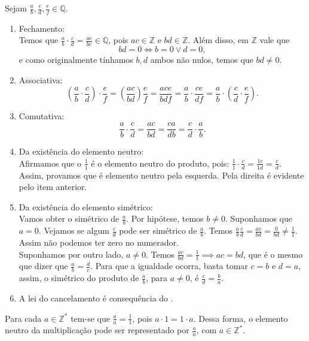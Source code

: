 \documentclass[../main.tex]{subfiles}
\begin{document}
\begin{dem}
    Sejam $\frac{a}{b}, \frac{c}{d}, \frac{e}{f} \in \mathbb{Q}$.
    \begin{enumerate}[label=(\roman*)]
        \item Fechamento: \\
        Temos que $\frac{a}{b} \cdot \frac{c}{d} = \frac{ac}{bc} \in \mathbb{Q}$, pois  
        $ac \in \mathbb{Z}$ e $bd \in \mathbb{Z}$. Além disso, em $\mathbb{Z}$ vale que 
        \[ bd = 0 \iff b = 0 \lor d = 0, \] e como originalmente tínhamos $b,d$ ambos não nulos, temos que $bd \neq 0$.
        
        \item Associativa: \\
            \[
            \left( \frac{a}{b} \cdot \frac{c}{d}\right) \cdot \frac{e}{f} = 
            \left(\frac{ac}{bd}\right) \frac{e}{f} = 
            \frac{ace}{bdf} = \frac{a}{b} \cdot \frac{ce}{df} = 
            \frac{a}{b} \cdot \left(\frac{c}{d} \cdot \frac{e}{f}\right)
            .
            \]
        
        \item Comutativa: \\
        \[ \frac{a}{b} \cdot \frac{c}{d} = 
            \frac{ac}{bd} = 
            \frac{ca}{db} = 
            \frac{c}{d} \cdot \frac{a}{b} . \]
            
        
        \item Da existência do elemento neutro: \\
        Afirmamos que o $\frac{1}{1}$ é o elemento neutro do produto, pois: $ \frac{1}{1}\cdot \frac{c}{d} = \frac{1c}{1d} = \frac{c}{d}$.
        Assim, provamos que é elemento neutro pela esquerda. Pela direita é evidente pelo item anterior. 
        
        
        \item Da existência do elemento simétrico: \\
        Vamos obter o simétrico de $\frac{a}{b}$. Por hipótese, temos $b \neq 0$. Suponhamos que $a=0$. Vejamos se algum $\frac{c}{d}$
        pode ser simétrico de $\frac{a}{b}$. Temos $\frac{a}{b} \frac{c}{d} = \frac{ac}{bd} = \frac{0}{bd} \neq \frac{1}{1}$. Assim não podemos ter zero no numerador. \\
        Suponhamos por outro lado, $a \neq 0$. Temos $\frac{ac}{bd} = \frac{1}{1} \implies ac = bd$, que é o mesmo que dizer que $\frac{a}{b} = \frac{d}{c}$. Para que a igualdade ocorra, basta tomar $c=b$ e $d=a$, assim, o simétrico do produto de $\frac{a}{b}$, para $a \neq 0$, é $\frac{c}{d} = \frac{b}{a}$.
        
        \item A lei do cancelamento é consequência do .
    \end{enumerate}    
\end{dem}
    \begin{obs}
        Para cada $a \in \mathbb{Z}^*$ tem-se que $\frac{a}{a}=\frac{1}{1}$, pois $a \cdot 1 = 1 \cdot a$. Dessa forma, o elemento neutro da multiplicação pode ser representado por $\frac{a}{a}$, com $a \in \mathbb{Z}^*$.
    \end{obs}
\end{document}
